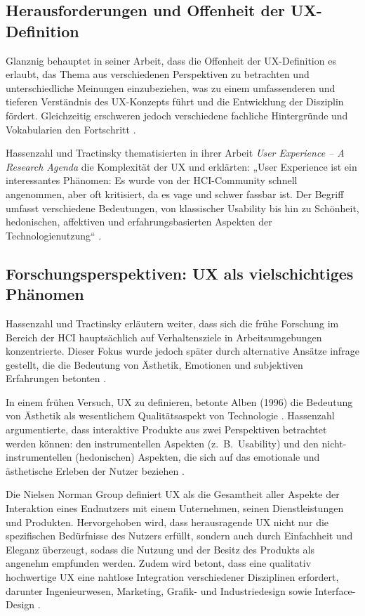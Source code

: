 \documentclass[12pt,oneside]{article}
\begin{document}
\subsection{Herausforderungen und Offenheit der UX-Definition}

Glanznig behauptet in seiner Arbeit, dass die Offenheit der UX-Definition  es erlaubt, das Thema aus verschiedenen Perspektiven zu betrachten und unterschiedliche Meinungen einzubeziehen, was zu einem umfassenderen und tieferen Verständnis des UX-Konzepts führt und die Entwicklung der Disziplin fördert. Gleichzeitig erschweren jedoch verschiedene fachliche Hintergründe und Vokabularien den Fortschritt \cite{glanznig}.

Hassenzahl und Tractinsky thematisierten in ihrer Arbeit \textit{User Experience – A Research Agenda} die Komplexität der UX und erklärten: „User Experience ist ein interessantes Phänomen: Es wurde von der HCI-Community schnell angenommen, aber oft kritisiert, da es vage und schwer fassbar ist. Der Begriff umfasst verschiedene Bedeutungen, von klassischer Usability bis hin zu Schönheit, hedonischen, affektiven und erfahrungsbasierten Aspekten der Technologienutzung“ \cite{research}.

\subsection{Forschungsperspektiven: UX als vielschichtiges Phänomen}

Hassenzahl und Tractinsky erläutern weiter, dass sich die frühe Forschung im Bereich der HCI hauptsächlich auf Verhaltensziele in Arbeitsumgebungen konzentrierte. Dieser Fokus wurde jedoch später durch alternative Ansätze infrage gestellt, die die Bedeutung von Ästhetik, Emotionen und subjektiven Erfahrungen betonten \cite{research}.

In einem frühen Versuch, UX zu definieren, betonte Alben (1996) die Bedeutung von Ästhetik als wesentlichem Qualitätsaspekt von Technologie \cite{research}. Hassenzahl argumentierte, dass interaktive Produkte aus zwei Perspektiven betrachtet werden können: den instrumentellen Aspekten (z.~B.\ Usability)
 und den nicht-instrumentellen (hedonischen) Aspekten, die sich auf das emotionale und ästhetische Erleben der Nutzer beziehen \cite{hassenzahl2003}.

Die Nielsen Norman Group definiert UX als die Gesamtheit aller Aspekte der Interaktion eines Endnutzers mit einem Unternehmen, seinen Dienstleistungen und Produkten. Hervorgehoben wird, dass herausragende UX nicht nur die spezifischen Bedürfnisse des Nutzers erfüllt, sondern auch durch Einfachheit und Eleganz überzeugt, sodass die Nutzung und der Besitz des Produkts als angenehm empfunden werden. Zudem wird betont, dass eine qualitativ hochwertige UX eine nahtlose Integration verschiedener Disziplinen erfordert, darunter Ingenieurwesen, Marketing, Grafik- und Industriedesign sowie Interface-Design \cite{nngroup}.
\end{document}
